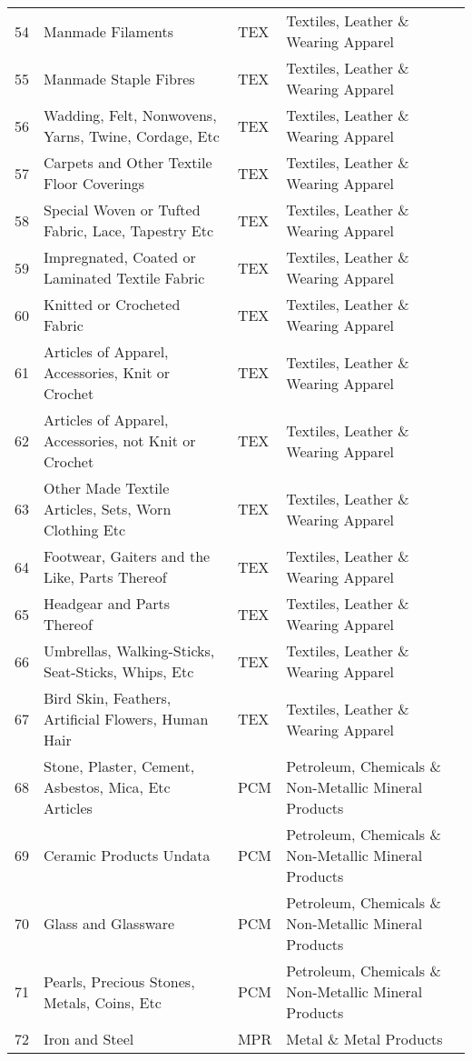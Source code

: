 \documentclass[a4paper]{article}
\begin{document}
\begin{table}[ht]
{\begin{tabular}{rlll}
  54 & Manmade Filaments & TEX & Textiles, Leather \& Wearing Apparel \\ 
  55 & Manmade Staple Fibres & TEX & Textiles, Leather \& Wearing Apparel \\ 
  56 & Wadding, Felt, Nonwovens, Yarns, Twine, Cordage, Etc & TEX & Textiles, Leather \& Wearing Apparel \\ 
  57 & Carpets and Other Textile Floor Coverings & TEX & Textiles, Leather \& Wearing Apparel \\ 
  58 & Special Woven or Tufted Fabric, Lace, Tapestry Etc & TEX & Textiles, Leather \& Wearing Apparel \\ 
  59 & Impregnated, Coated or Laminated Textile Fabric & TEX & Textiles, Leather \& Wearing Apparel \\ 
  60 & Knitted or Crocheted Fabric & TEX & Textiles, Leather \& Wearing Apparel \\ 
  61 & Articles of Apparel, Accessories, Knit or Crochet & TEX & Textiles, Leather \& Wearing Apparel \\ 
  62 & Articles of Apparel, Accessories, not Knit or Crochet & TEX & Textiles, Leather \& Wearing Apparel \\ 
  63 & Other Made Textile Articles, Sets, Worn Clothing Etc & TEX & Textiles, Leather \& Wearing Apparel \\ 
  64 & Footwear, Gaiters and the Like, Parts Thereof & TEX & Textiles, Leather \& Wearing Apparel \\ 
  65 & Headgear and Parts Thereof & TEX & Textiles, Leather \& Wearing Apparel \\ 
  66 & Umbrellas, Walking-Sticks, Seat-Sticks, Whips, Etc & TEX & Textiles, Leather \& Wearing Apparel \\ 
  67 & Bird Skin, Feathers, Artificial Flowers, Human Hair & TEX & Textiles, Leather \& Wearing Apparel \\ 
  68 & Stone, Plaster, Cement, Asbestos, Mica, Etc Articles & PCM & Petroleum, Chemicals \& Non-Metallic Mineral Products \\ 
  69 & Ceramic Products Undata & PCM & Petroleum, Chemicals \& Non-Metallic Mineral Products \\ 
  70 & Glass and Glassware & PCM & Petroleum, Chemicals \& Non-Metallic Mineral Products \\ 
  71 & Pearls, Precious Stones, Metals, Coins, Etc & PCM & Petroleum, Chemicals \& Non-Metallic Mineral Products \\ 
  72 & Iron and Steel & MPR & Metal \& Metal Products \\ 

\end{tabular}}
\end{table}
\end{document}
